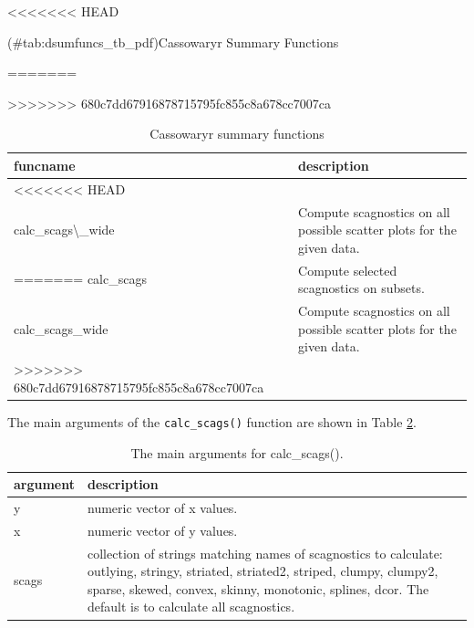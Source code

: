 \begin{Schunk}
\begin{table}

<<<<<<< HEAD
\caption{(\#tab:dsumfuncs_tb_pdf)Cassowaryr Summary Functions}
=======
\caption{\label{tab:dsumfuncs-tb-pdf}Cassowaryr summary functions}
>>>>>>> 680c7dd67916878715795fc855c8a678cc7007ca
\centering
\begin{tabular}[t]{>{\raggedright\arraybackslash}p{2cm}l}
\toprule
funcname & description\\
\midrule
<<<<<<< HEAD
\cellcolor{gray!6}{calc\textbackslash{}\_scags} & \cellcolor{gray!6}{Compute selected scagnostics on subsets.}\\
calc\_scags\textbackslash{}\_wide & Compute scagnostics on all possible scatter plots for the given data.\\
=======
calc\_scags & Compute selected scagnostics on subsets.\\
calc\_scags\_wide & Compute scagnostics on all possible scatter plots for the given data.\\
>>>>>>> 680c7dd67916878715795fc855c8a678cc7007ca
\bottomrule
\end{tabular}
\end{table}

\end{Schunk}

The main arguments of the \texttt{calc\_scags()} function are shown in
Table \ref{tab:calcfunc-tb-pdf}.

\begin{Schunk}
\begin{table}

\caption{\label{tab:calcfunc-tb-pdf}The main arguments for calc\_scags().}
\centering
\begin{tabular}[t]{l|l}
\hline
argument & description\\
\hline
y & numeric vector of x values.\\
\hline
x & numeric vector of y values.\\
\hline
scags & collection of strings matching names of scagnostics to calculate: outlying, stringy, striated, striated2, striped, clumpy, clumpy2, sparse, skewed, convex, skinny, monotonic, splines, dcor. The default is to calculate all scagnostics.\\
\hline
\end{tabular}
\end{table}

\end{Schunk}

